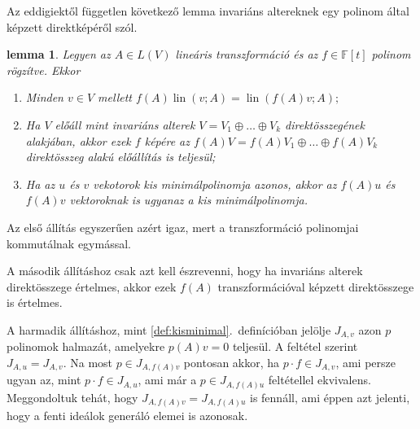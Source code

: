 \documentclass[a4paper, showtrims]{memoir}
\makeatletter
\renewenvironment{proof}[1][\proofname]
    {\par\pushQED{\qed}%
    \normalfont \topsep6\p@\@plus6\p@\relax
    \trivlist
    \item[\hskip\labelsep
        \itshape
    #1\@addpunct{:}]\ignorespaces}
    {\popQED\endtrivlist\@endpefalse}
\theoremstyle{plain}
\newtheorem{lemma}[proposition]{lemma}
\theoremstyle{remark}
\theoremstyle{definition}
\DeclareMathOperator{\lin}{lin}
\makeatother
\begin{document}
Az eddigiektől független következő lemma invariáns altereknek egy polinom által képzett direktképéről szól.
\begin{lemma}
    Legyen az $A\in L\left( V \right)$ lineáris transzformáció és az $f\in\mathbb{F}\left[t  \right]$
    polinom rögzítve.
    Ekkor
    \begin{enumerate}
        \item Minden $v\in V$ mellett 
            \begin{math}
                f\left( A \right)\lin\left( v;A \right)
                =
                \lin\left( f\left( A \right)v;A \right);
            \end{math}
        \item Ha $V$ előáll mint invariáns alterek $V=V_1\oplus\ldots\oplus V_k$ direktösszegének alakjában, 
            akkor ezek $f$ képére az
            \begin{math}
                f\left( A \right)V
                =
                f\left( A \right)V_1
                \oplus\ldots\oplus
                f\left( A \right)V_k
            \end{math}
            direktösszeg alakú előállítás is teljesül;
        \item
            Ha az $u$ és $v$ vekotorok kis minimálpolinomja azonos,
            akkor az $f\left( A \right)u$ és $f\left( A \right)v$ vektoroknak is ugyanaz a kis minimálpolinomja.
            \qedhere
    \end{enumerate}
    \label{le:cikl-egyert}
\end{lemma}
\begin{proof}
    Az első állítás egyszerűen azért igaz,
    mert a transzformáció polinomjai kommutálnak egymással.

    A második állításhoz csak azt kell észrevenni, 
    hogy ha invariáns alterek direktösszege értelmes,
    akkor ezek $f\left( A \right)$ transzformációval képzett direktösszege is értelmes.

    A harmadik állításhoz, mint \ref{def:kisminimal}.~definícióban jelölje
    \begin{math}
        J_{A,v}
    \end{math}
    azon $p$ polinomok halmazát, amelyekre $p\left( A \right)v=0$ teljesül. 
    A feltétel szerint 
    \begin{math}
        J_{A,u}=J_{A,v}.
    \end{math}
    Na most $p\in J_{A,f\left( A \right)v}$ pontosan akkor,
    ha $p\cdot f\in J_{A,v}$,
    ami persze ugyan az, mint 
    $p\cdot f\in J_{A,u}$, ami már a $p\in J_{A,f\left( A \right)u}$ feltétellel ekvivalens.
    Meggondoltuk tehát, hogy 
    \begin{math}
        J_{A,f\left( A \right)v}
        =
        J_{A,f\left( A \right)u}
    \end{math}
    is fennáll, ami éppen azt jelenti, hogy a fenti ideálok generáló elemei is azonosak.
\end{proof}
\end{document}
